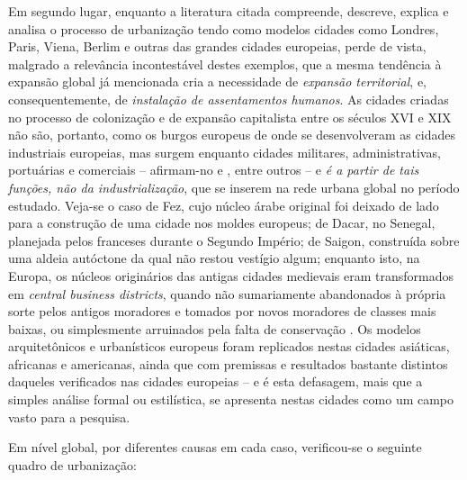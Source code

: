 Em segundo lugar, enquanto a literatura citada compreende, descreve, explica e analisa o processo de urbanização tendo como modelos cidades como Londres, Paris, Viena, Berlim e outras das grandes cidades europeias, perde de vista, malgrado a relevância incontestável destes exemplos, que a mesma tendência à expansão global já mencionada cria a necessidade de \textit{expansão territorial}, e, consequentemente, de \textit{instalação de assentamentos humanos}. As cidades criadas no processo de colonização e de expansão capitalista entre os séculos XVI e XIX não são, portanto, como os burgos europeus de onde se desenvolveram as cidades industriais europeias, mas surgem enquanto cidades militares, administrativas, portuárias e comerciais -- afirmam-no  e , entre outros -- e \textit{é a partir de tais funções, não da industrialização}, que se inserem na rede urbana global no período estudado. Veja-se o caso de Fez, cujo núcleo árabe original foi deixado de lado para a construção de uma cidade nos moldes europeus; de Dacar, no Senegal, planejada pelos franceses durante o Segundo Império; de Saigon, construída sobre uma aldeia autóctone da qual não restou vestígio algum; enquanto isto, na Europa, os núcleos originários das antigas cidades medievais eram transformados em \textit{central business districts}, quando não sumariamente abandonados à própria sorte pelos antigos moradores e tomados por novos moradores de classes mais baixas, ou simplesmente arruinados pela falta de conservação \cite[pp.~607-612]{benevolo_historia_1983}. Os modelos arquitetônicos e urbanísticos europeus foram replicados nestas cidades asiáticas, africanas e americanas, ainda que com premissas e resultados bastante distintos daqueles verificados nas cidades europeias -- e é esta defasagem, mais que a simples análise formal ou estilística, se apresenta nestas cidades como um campo vasto para a pesquisa.

Em nível global, por diferentes causas em cada caso, verificou-se o seguinte quadro de urbanização:



